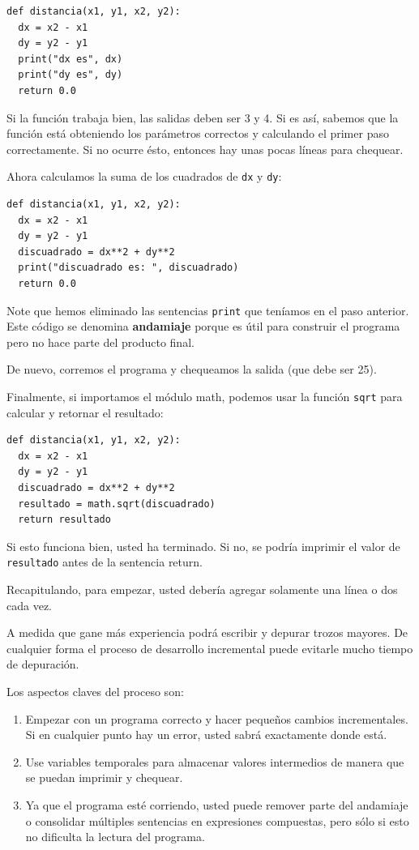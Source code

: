 \begin{verbatim}
def distancia(x1, y1, x2, y2):
  dx = x2 - x1
  dy = y2 - y1
  print("dx es", dx)
  print("dy es", dy)
  return 0.0
\end{verbatim}
 Si la función trabaja bien, las salidas deben ser 3 y 4. Si es así,
sabemos que la función está obteniendo los parámetros correctos y
calculando el primer paso correctamente. Si no ocurre ésto, entonces
hay unas pocas líneas para chequear.

Ahora calculamos la suma de los cuadrados de \texttt{dx} y \texttt{dy}:

\begin{verbatim}
def distancia(x1, y1, x2, y2):
  dx = x2 - x1
  dy = y2 - y1
  discuadrado = dx**2 + dy**2
  print("discuadrado es: ", discuadrado)
  return 0.0
\end{verbatim}
 Note que hemos eliminado las sentencias \texttt{print} que teníamos
en el paso anterior. Este código se denomina \textbf{andamiaje} porque
es útil para construir el programa pero no hace parte del producto
final.

De nuevo, corremos el programa y chequeamos la salida (que debe ser
25).

Finalmente, si importamos el módulo math, podemos usar la función
\texttt{sqrt} para calcular y retornar el resultado:

\begin{verbatim}
def distancia(x1, y1, x2, y2):
  dx = x2 - x1
  dy = y2 - y1
  discuadrado = dx**2 + dy**2
  resultado = math.sqrt(discuadrado)
  return resultado
\end{verbatim}
 Si esto funciona bien, usted ha terminado. Si no, se podría imprimir
el valor de \texttt{resultado} antes de la sentencia return.

Recapitulando, para empezar, usted debería agregar solamente una línea
o dos cada vez.

A medida que gane más experiencia podrá escribir y depurar trozos
mayores. De cualquier forma el proceso de desarrollo incremental puede
evitarle mucho tiempo de depuración.

Los aspectos claves del proceso son:
\begin{enumerate}
\item Empezar con un programa correcto y hacer pequeños cambios incrementales.
Si en cualquier punto hay un error, usted sabrá exactamente donde
está.
\item Use variables temporales para almacenar valores intermedios de manera
que se puedan imprimir y chequear.
\item Ya que el programa esté corriendo, usted puede remover parte del andamiaje
o consolidar múltiples sentencias en expresiones compuestas, pero
sólo si esto no dificulta la lectura del programa.
\end{enumerate}

